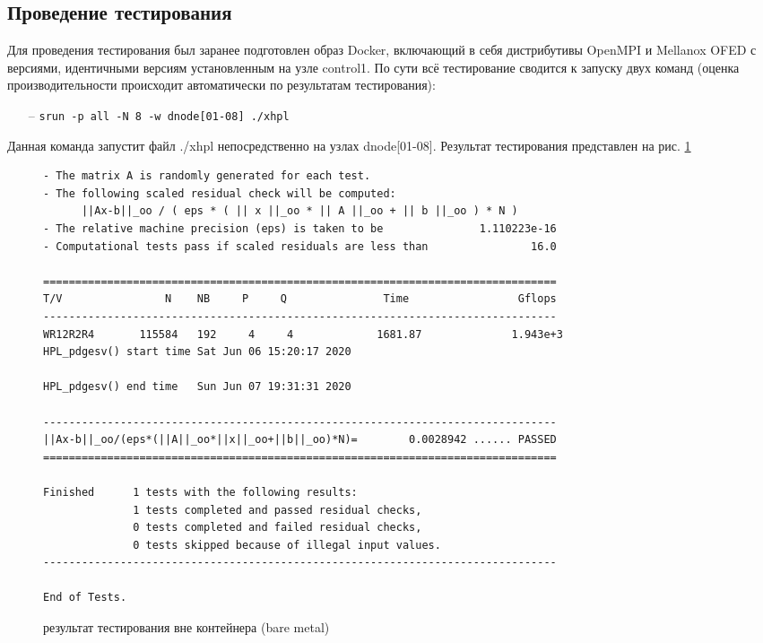 \documentclass[a4paper]{extarticle}
\begin{document}
\subsection{Проведение тестирования}

Для проведения тестирования был заранее подготовлен образ Docker, включающий в себя дистрибутивы OpenMPI и Mellanox OFED с версиями, идентичными версиям установленным на узле control1. По сути всё тестирование сводится к запуску двух команд (оценка производительности происходит автоматически по результатам тестирования):

\begin{itemize}
\item[--] \verb|srun -p all -N 8 -w dnode[01-08] ./xhpl|
\end{itemize}

Данная команда запустит файл ./xhpl непосредственно на узлах dnode[01-08]. Результат тестирования представлен на рис. \ref{fig:hplres1}

\begin{figure}[H]
\begin{verbatim}
- The matrix A is randomly generated for each test.
- The following scaled residual check will be computed:
      ||Ax-b||_oo / ( eps * ( || x ||_oo * || A ||_oo + || b ||_oo ) * N )
- The relative machine precision (eps) is taken to be               1.110223e-16
- Computational tests pass if scaled residuals are less than                16.0

================================================================================
T/V                N    NB     P     Q               Time                 Gflops
--------------------------------------------------------------------------------
WR12R2R4       115584   192     4     4             1681.87              1.943e+3
HPL_pdgesv() start time Sat Jun 06 15:20:17 2020

HPL_pdgesv() end time   Sun Jun 07 19:31:31 2020

--------------------------------------------------------------------------------
||Ax-b||_oo/(eps*(||A||_oo*||x||_oo+||b||_oo)*N)=        0.0028942 ...... PASSED
================================================================================

Finished      1 tests with the following results:
              1 tests completed and passed residual checks,
              0 tests completed and failed residual checks,
              0 tests skipped because of illegal input values.
--------------------------------------------------------------------------------

End of Tests.
\end{verbatim}
\captionsetup{labelfont=bf, labelsep=space}
\caption{результат тестирования вне контейнера (bare metal)}
\label{fig:hplres1}
\end{figure}
\end{document}
